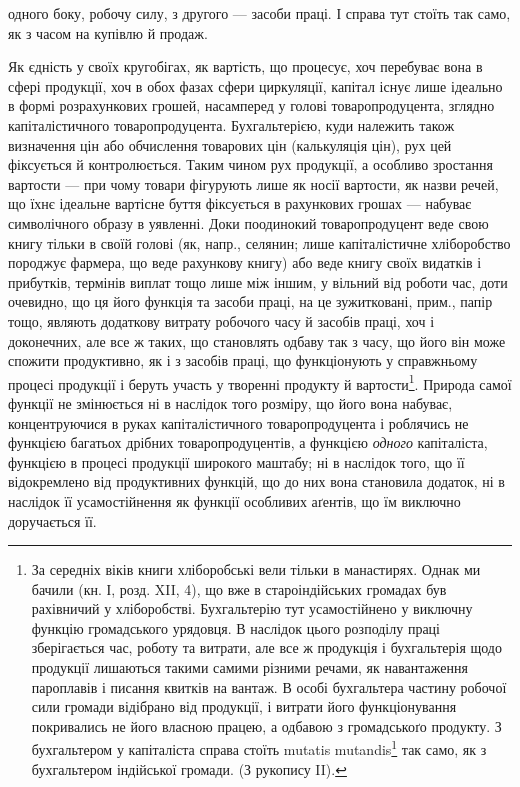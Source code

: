 \parcont{}  %
одного боку, робочу силу, з другого — засоби праці. І справа тут стоїть
так само, як з часом на купівлю й продаж.

Як єдність у своїх кругобігах, як вартість, що процесує, хоч перебуває
вона в сфері продукції, хоч в обох фазах сфери циркуляції, капітал
існує лише ідеально в формі розрахункових грошей, насамперед у голові
товаропродуцента, зглядно капіталістичного товаропродуцента. Бухгальтерією,
куди належить також визначення цін або обчислення товарових
цін (калькуляція цін), рух цей фіксується й контролюється. Таким
чином рух продукції, а особливо зростання вартости — при чому товари
фігурують лише як носії вартости, як назви речей, що їхнє ідеальне
вартісне буття фіксується в рахункових грошах — набуває символічного
образу в уявленні. Доки поодинокий товаропродуцент веде свою книгу
тільки в своїй голові (як, напр., селянин; лише капіталістичне хліборобство
породжує фармера, що веде рахункову книгу) або веде книгу своїх
видатків і прибутків, термінів виплат тощо лише між іншим, у вільний від
роботи час, доти очевидно, що ця його функція та засоби праці, на це
зужитковані, прим., папір тощо, являють додаткову витрату робочого часу
й засобів праці, хоч і доконечних, але все ж таких, що становлять одбаву
так з часу, що його він може спожити продуктивно, як і з засобів праці, що
функціонують у справжньому процесі продукції і беруть участь у творенні
продукту й вартости\footnote{
За середніх віків книги хліборобські вели тільки в манастирях.
\label{original-89}Однак ми
бачили (кн. І, розд. XII, 4), що вже в староіндійських громадах був рахівничий
у хліборобстві. Бухгальтерію тут усамостійнено у виключну функцію громадського
урядовця. В наслідок цього розподілу праці зберігається час, роботу та
витрати, але все ж продукція і бухгальтерія щодо продукції лишаються
такими самими різними речами, як навантаження пароплавів і писання квитків на
вантаж. В особі бухгальтера частину робочої сили громади відібрано від
продукції, і витрати його функціонування покривались не його власною
працею, а одбавою з громадськоґо продукту. З бухгальтером у капіталіста
справа стоїть mutatis mutandis\footnote*{
Змінивши те, що треба змінити, або з відповідними змінами. \emph{Ред.}
} так само, як з бухгальтером індійської громади. (З рукопису II).
}. Природа самої функції не змінюється ні в наслідок
того розміру, що його вона набуває, концентруючися в руках капіталістичного
товаропродуцента і роблячись не функцією багатьох дрібних товаропродуцентів,
а функцією \emph{одного} капіталіста, функцією в процесі продукції
широкого маштабу; ні в наслідок того, що її відокремлено від продуктивних
функцій, що до них вона становила додаток, ні в наслідок її усамостійнення
як функції особливих аґентів, що їм виключно доручається її.

